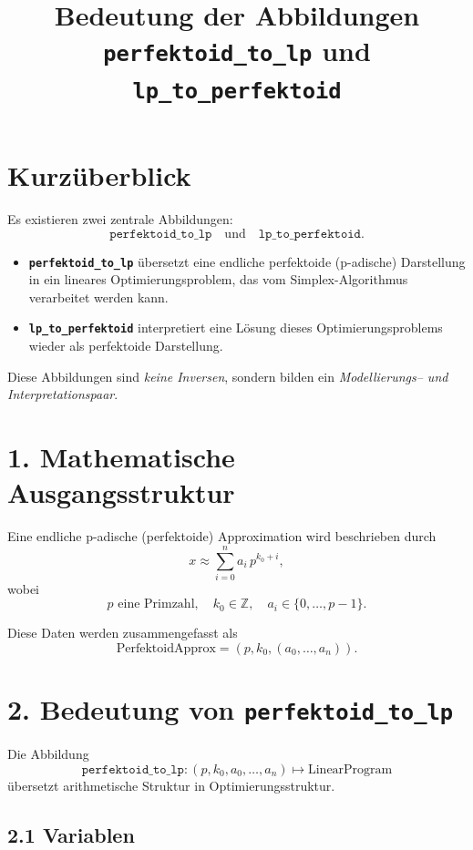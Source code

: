 \documentclass[11pt]{article}
\title{Bedeutung der Abbildungen \texttt{perfektoid\_to\_lp} und \texttt{lp\_to\_perfektoid}}
\author{}
\date{}
\begin{document}
\maketitle

\section*{Kurzüberblick}

Es existieren zwei zentrale Abbildungen:
\[
\texttt{perfektoid\_to\_lp}
\quad\text{und}\quad
\texttt{lp\_to\_perfektoid}.
\]

\begin{itemize}
\item \textbf{\texttt{perfektoid\_to\_lp}} übersetzt eine endliche perfektoide (p-adische) Darstellung
      in ein lineares Optimierungsproblem, das vom Simplex-Algorithmus verarbeitet werden kann.
\item \textbf{\texttt{lp\_to\_perfektoid}} interpretiert eine Lösung dieses Optimierungsproblems
      wieder als perfektoide Darstellung.
\end{itemize}

Diese Abbildungen sind \emph{keine Inversen}, sondern bilden ein
\emph{Modellierungs-- und Interpretationspaar}.

\section*{1. Mathematische Ausgangsstruktur}

Eine endliche p-adische (perfektoide) Approximation wird beschrieben durch
\[
x \approx \sum_{i=0}^{n} a_i \, p^{k_0 + i},
\]
wobei
\[
p \text{ eine Primzahl}, \quad
k_0 \in \mathbb{Z}, \quad
a_i \in \{0,\dots,p-1\}.
\]

Diese Daten werden zusammengefasst als
\[
\text{PerfektoidApprox} = (p, k_0, (a_0,\dots,a_n)).
\]

\section*{2. Bedeutung von \texttt{perfektoid\_to\_lp}}

Die Abbildung
\[
\texttt{perfektoid\_to\_lp} :
(p, k_0, a_0,\dots,a_n)
\longmapsto
\text{LinearProgram}
\]
übersetzt arithmetische Struktur in Optimierungsstruktur.

\subsection*{2.1 Variablen}
\end{document}
